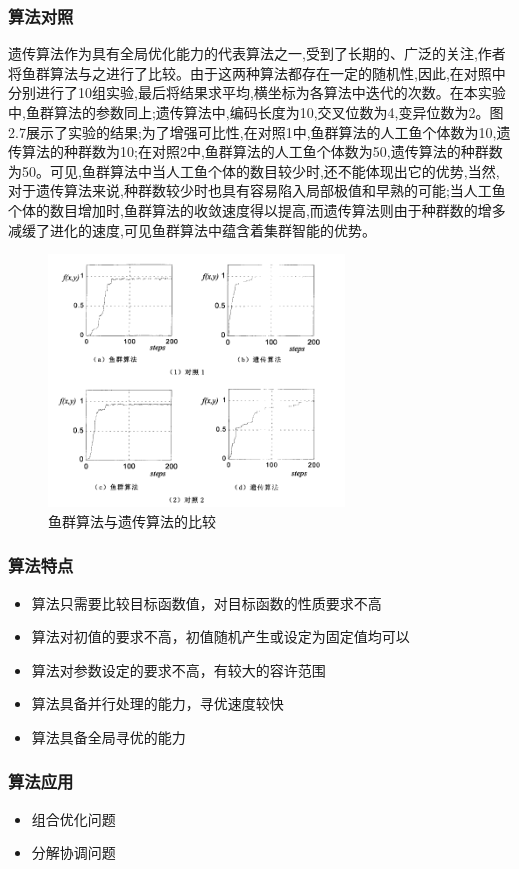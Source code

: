 \begin{frame}
\frametitle{算法对照}
\small{遗传算法作为具有全局优化能力的代表算法之一,受到了长期的、广泛的关注,作者将鱼群算法与之进行了比较。由于这两种算法都存在一定的随机性,因此,在对照中分别进行了10组实验,最后将结果求平均,横坐标为各算法中迭代的次数。在本实验中,鱼群算法的参数同上;遗传算法中,编码长度为10,交叉位数为4,变异位数为2。图2.7展示了实验的结果;为了增强可比性,在对照1中,鱼群算法的人工鱼个体数为10,遗传算法的种群数为10;在对照2中,鱼群算法的人工鱼个体数为50,遗传算法的种群数为50。可见,鱼群算法中当人工鱼个体的数目较少时,还不能体现出它的优势,当然,对于遗传算法来说,种群数较少时也具有容易陷入局部极值和早熟的可能;当人工鱼个体的数目增加时,鱼群算法的收敛速度得以提高,而遗传算法则由于种群数的增多减缓了进化的速度,可见鱼群算法中蕴含着集群智能的优势。}

\begin{figure}
\centering
\includegraphics[width=0.7\textwidth]{pic/fish14.png}
\caption{鱼群算法与遗传算法的比较}
\end{figure}

\end{frame}

\begin{frame}
	\frametitle{算法特点}
	\begin{itemize}
		\item{算法只需要比较目标函数值，对目标函数的性质要求不高}
		\item{算法对初值的要求不高，初值随机产生或设定为固定值均可以}
		\item{算法对参数设定的要求不高，有较大的容许范围}
		\item{算法具备并行处理的能力，寻优速度较快}
		\item{算法具备全局寻优的能力}
	\end{itemize}
\end{frame}
\begin{frame}
	\frametitle{算法应用}	
	\begin{itemize}
		\item{组合优化问题}
		\item{分解协调问题}
	\end{itemize}
\end{frame}


